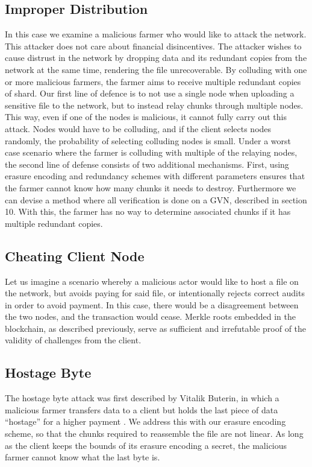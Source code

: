 \documentclass[a4paper,10pt]{article}
\begin{document}
\subsection{Improper Distribution}
In this case we examine a malicious farmer who would like to attack the network. This attacker does not care about financial disincentives. The attacker wishes to cause distrust in the network by dropping data and its redundant copies from the network at the same time, rendering the file unrecoverable. By colluding with one or more malicious farmers, the farmer aims to receive multiple redundant copies of shard. Our first line of defence is to not use a single node when uploading a sensitive file to the network, but to instead relay chunks through multiple nodes. This way, even if one of the nodes is malicious, it cannot fully carry out this attack. Nodes would have to be colluding, and if the client selects nodes randomly, the probability of selecting colluding nodes is small. Under a worst case scenario where the farmer is colluding with multiple of the relaying nodes, the second line of defense consists of two additional mechanisms. First, using erasure encoding and redundancy schemes with different parameters ensures that the farmer cannot know how many chunks it needs to destroy. Furthermore we can devise a method where all verification is done on a GVN, described in section 10. With this, the farmer has no way to determine associated chunks if it has multiple redundant copies. 

\subsection{Cheating Client Node}
Let us imagine a scenario whereby a malicious actor would like to host a file on the network, but avoids paying for said file, or intentionally rejects correct audits in order to avoid payment. In this case, there would be a disagreement between the two nodes, and the transaction would cease. Merkle roots embedded in the blockchain, as described previously, serve as sufficient and irrefutable proof of the validity of challenges from the client.

\subsection{Hostage Byte}
The hostage byte attack was first described by Vitalik Buterin, in which a malicious farmer transfers data to a client but holds the last piece of data “hostage” for a higher payment \cite{16}. We address this with our erasure encoding scheme, so that the chunks required to reassemble the file are not linear. As long as the client keeps the bounds of its erasure encoding a secret, the malicious farmer cannot know what the last byte is.
\end{document}
